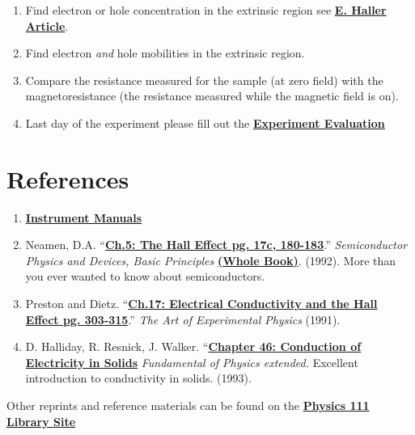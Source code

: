 \documentclass{../lab}
\begin{document}
\begin{enumerate}
    \item Find electron or hole concentration in the extrinsic region see \href{http://physics111.lib.berkeley.edu/Physics111/Reprints/SHE/24-Haller.pdf}{\textbf{E. Haller Article}}.

    \item Find electron \emph{and} hole mobilities in the extrinsic region.

    \item Compare the resistance measured for the sample (at zero field) with the magnetoresistance (the resistance measured while the magnetic field is on).

    \item Last day of the experiment please fill out the \href{\ExperimentEvaluation}{\textbf{Experiment Evaluation}}

\end{enumerate}

\section{References}
\label{sec:References}

\begin{enumerate}
    \item \href{http://experimentationlab.berkeley.edu/node/106}{\textbf{Instrument Manuals}}

    \item Neamen, D.A. ``\href{http://physics111.lib.berkeley.edu/Physics111/Reprints/SHE/09-Semiconductors.pdf}{\textbf{Ch.5: The Hall Effect pg. 17c, 180-183}}.'' \emph{Semiconductor Physics and Devices, Basic Principles} \href{http://physics111.lib.berkeley.edu/Physics111/Reprints/SHE/Donald_A._Neamen_Semiconductor_Physics_And_Devices_Basic_Principles.pdf}{\textbf{ (Whole Book)}}. (1992). More than you ever wanted to know about semiconductors.

    \item Preston and Dietz. ``\href{http://physics111.lib.berkeley.edu/Physics111/Reprints/SHE/07-Electrical\_Conductivity.pdf}{\textbf{Ch.17: Electrical Conductivity and the Hall Effect pg. 303-315}}.'' \emph{The Art of Experimental Physics} (1991).

    \item D. Halliday, R. Resnick, J. Walker. ``\href{http://physics111.lib.berkeley.edu/Physics111/Reprints/SHE/Halliday\_Resnick/Ch.\%2046\%20Conduction\%20of\%20electricity\%20in\%20solids.pdf}{\textbf{Chapter 46: Conduction of Electricity in Solids}} \emph{Fundamental of Physics extended.} Excellent introduction to conductivity in solids. (1993).

\end{enumerate}

\noindent Other reprints and reference materials can be found on the \href{http://physics111.lib.berkeley.edu/Physics111/Reprints/SHE/SHE\_index.html}{\textbf{Physics 111 Library Site}}
\end{document}
